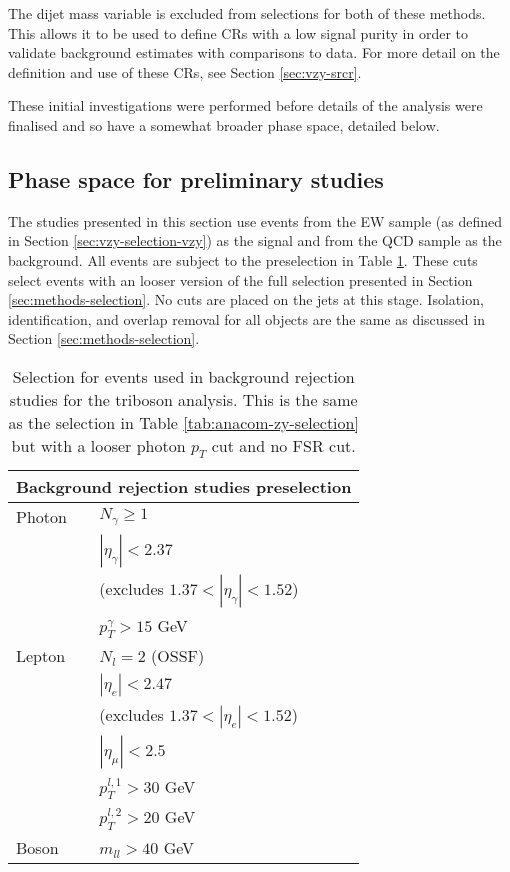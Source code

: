 The dijet mass variable is excluded from selections for both of
these methods. This allows it to be used to define \acp{CR} with a low signal
purity in order to validate background estimates with comparisons to data. For
more detail on the definition and use of these \acp{CR}, see Section
\ref{sec:vzy-srcr}.

These initial investigations were performed before details of the analysis
were finalised and so have a somewhat broader phase space, detailed below.

\subsection{Phase space for preliminary studies}

The studies presented in this section use events from the \ac{EW} \VZy sample
(as defined in Section \ref{sec:vzy-selection-vzy}) as the signal and from the
\ac{QCD} \Zy sample as the background. All events are subject to the
preselection in Table \ref{tab:vzy-bdt-preliminaryselection}.  These cuts select
\Zy events with an looser version of the full \Zy selection presented in
Section \ref{sec:methods-selection}.  No cuts are placed on the jets at this
stage.  Isolation, identification, and overlap removal for all objects are the
same as discussed in Section \ref{sec:methods-selection}.

\begin{table}
  \centering
  \renewcommand\arraystretch{1.3}
  \caption{
    Selection for events used in background rejection studies for the \VZy
    triboson analysis. This is the same as the \Zy selection in Table
    \ref{tab:anacom-zy-selection} but with a looser photon $p_T$ cut and no
    \acs{FSR} cut.
  }
  \begin{tabular}{p{6em}l}
    \hline\hline
    \multicolumn{2}{c}{Background rejection studies preselection} \\
    \hline
    Photon & $N_\gamma \geq 1$ \\
           & $|\eta_\gamma| < 2.37$ \\
           & (excludes $1.37 < |\eta_\gamma| < 1.52$) \\
           & $p_T^\gamma > 15$ GeV \\
    \hline
    Lepton & $N_l = 2$ (OSSF)\\
           & $|\eta_e| < 2.47$ \\
           & (excludes $1.37 < |\eta_e| < 1.52$) \\
           & $|\eta_\mu| < 2.5$ \\
           & $p_T^{l,1} > 30$ GeV \\
           & $p_T^{l,2} > 20$ GeV \\
    \hline
    Boson  & $m_{ll} > 40$ GeV \\
    \hline\hline
  \end{tabular}
  \label{tab:vzy-bdt-preliminaryselection}
\end{table}

